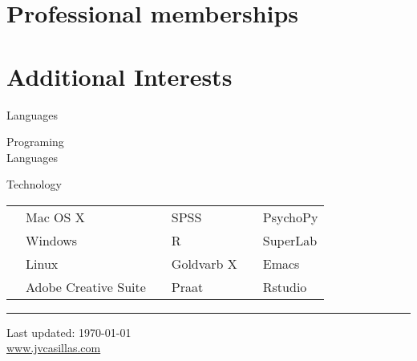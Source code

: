 \documentclass[11pt,letterpaper]{moderncv}
\begin{document}
\section{Professional memberships}






\section{Additional Interests}
{\color{UAred} Languages} \vspace{-.18in} \\


{\color{UAred} Programing\\ Languages} \vspace{-.37in} \\
\cventry{}{\LaTeX}{}{}{}{}
 

{\color{UAred} Technology} \\

\begin{tabular}{p{1.15in}lp{.7in}lp{1.1in}l}
   & Mac OS X             & & SPSS       & \phantom{.} & PsychoPy \\ [-2.5ex]
   & Windows              & & R          & \phantom{.} & SuperLab \\ [-2.5ex]
   & Linux                & & Goldvarb X & \phantom{.} & Emacs \\ [-2.5ex]
   & Adobe Creative Suite & & Praat      & \phantom{.} & Rstudio \\
\end{tabular}


\noindent \rule{490pt}{.5 mm}

\smallskip

\begin{center}
  \begin{footnotesize}
    Last updated: \today \\
    \href{http://www.jvcasillas.com}{www.jvcasillas.com}
  \end{footnotesize}
\end{center}


\end{document}

